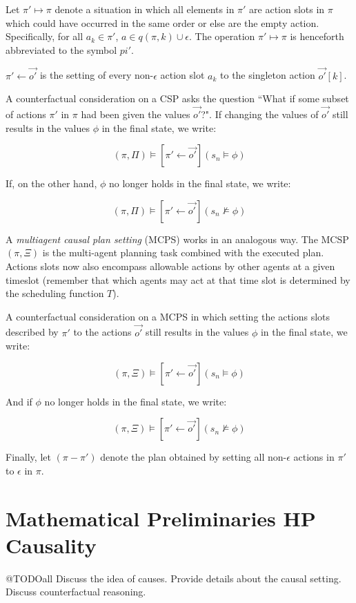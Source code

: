 \documentclass{article}
\theoremstyle{plain}
\theoremstyle{definition}
\begin{document}
Let $\pi'\mapsto \pi$ denote a situation in which all elements in $\pi'$ are action slots in $\pi$ which could have occurred in the same order or else are the empty action. Specifically, for all $a_k \in \pi'$, $a \in q(\pi,k) \cup \epsilon$. The operation $\pi'\mapsto \pi$ is henceforth abbreviated to the symbol $pi'$.

$\pi' \leftarrow \vec{o'}$ is the setting of every non-$\epsilon$ action slot $a_k$ to the singleton action $\vec{o'}[k]$.


A counterfactual consideration on a CSP asks the question ``What if some subset of actions $\pi'$ in $\pi$ had been given the values $\vec{o'}$?". If changing the values of $\vec{o'}$ still results in the values $\phi$ in the final state, we write:

\[
(\pi, \Pi) \models [\pi' \leftarrow \vec{o'}](s_n \models \phi)
\]

If, on the other hand, $\phi$ no longer holds in the final state, we write:

\[
(\pi, \Pi) \models [\pi' \leftarrow \vec{o'}](s_n \not\models \phi)
\]


A \textit{multiagent causal plan setting} (MCPS) works in an analogous way. The MCSP $(\pi,\Xi)$ is the multi-agent planning task combined with the executed plan. Actions slots now also encompass allowable actions by other agents at a given timeslot (remember that which agents may act at that time slot is determined by the scheduling function $T$).

A counterfactual consideration on a MCPS in which setting the actions slots described by $\pi'$ to the actions $\vec{o'}$ still results in the values $\phi$ in the final state, we write:

\[
(\pi, \Xi) \models [\pi' \leftarrow \vec{o'}](s_n \models \phi)
\]

And if $\phi$ no longer holds in the final state, we write:

\[
(\pi, \Xi) \models [\pi' \leftarrow \vec{o'}](s_n \not\models \phi)
\]

Finally, let $(\pi-\pi')$ denote the plan obtained by setting all non-$\epsilon$ actions in $\pi'$ to $\epsilon$ in $\pi$.

\section{Mathematical Preliminaries HP Causality}

@TODOall  Discuss the idea of causes. Provide details about the causal setting. Discuss counterfactual reasoning.
\end{document}

